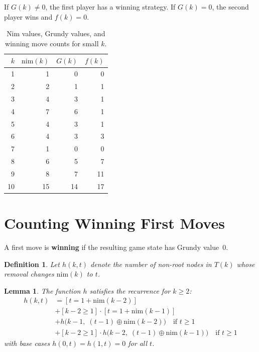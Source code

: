 \documentclass[11pt,a4paper]{article}
\newtheorem{definition}{Definition}
\newtheorem{lemma}{Lemma}
\begin{document}
If $G(k) \neq 0$, the first player has a winning strategy. If $G(k) = 0$, the second player wins and $f(k) = 0$.

\begin{table}[h]
\centering
\begin{tabular}{r|rr|r}
\toprule
$k$ & $\mathrm{nim}(k)$ & $G(k)$ & $f(k)$ \\
\midrule
1 & 1 & 0 & 0 \\
2 & 2 & 1 & 1 \\
3 & 4 & 3 & 1 \\
4 & 7 & 6 & 1 \\
5 & 4 & 3 & 1 \\
6 & 4 & 3 & 3 \\
7 & 1 & 0 & 0 \\
8 & 6 & 5 & 7 \\
9 & 8 & 7 & 11 \\
10 & 15 & 14 & 17 \\
\bottomrule
\end{tabular}
\caption{Nim values, Grundy values, and winning move counts for small $k$.}
\end{table}

\section{Counting Winning First Moves}

A first move is \textbf{winning} if the resulting game state has Grundy value~0.

\begin{definition}
Let $h(k, t)$ denote the number of non-root nodes in $T(k)$ whose removal changes $\mathrm{nim}(k)$ to $t$.
\end{definition}

\begin{lemma}
The function $h$ satisfies the recurrence for $k \geq 2$:
\begin{align}
    h(k, t) &= [t = 1 + \mathrm{nim}(k{-}2)] \label{eq:caseA} \\
    &+ [k{-}2 \geq 1] \cdot [t = 1 + \mathrm{nim}(k{-}1)] \label{eq:caseB} \\
    &+ h\bigl(k{-}1,\; (t{-}1) \oplus \mathrm{nim}(k{-}2)\bigr) \quad \text{if } t \geq 1 \label{eq:caseC} \\
    &+ [k{-}2 \geq 1] \cdot h\bigl(k{-}2,\; (t{-}1) \oplus \mathrm{nim}(k{-}1)\bigr) \quad \text{if } t \geq 1 \label{eq:caseD}
\end{align}
with base cases $h(0, t) = h(1, t) = 0$ for all $t$.
\end{lemma}
\end{document}
